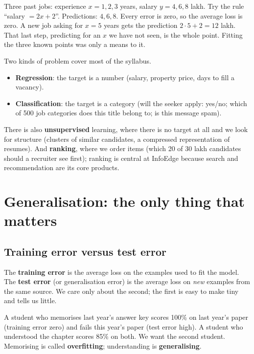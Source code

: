\begin{example}
Three past jobs: experience $x = 1, 2, 3$ years, salary $y = 4, 6, 8$ lakh. Try the rule ``salary $= 2x + 2$''.
Predictions: $4, 6, 8$. Every error is zero, so the average loss is zero. A new job asking for $x=5$ years gets
the prediction $2\cdot5+2 = 12$ lakh. That last step, predicting for an $x$ we have not seen, is the whole
point. Fitting the three known points was only a means to it.
\end{example}

Two kinds of problem cover most of the syllabus.
\begin{itemize}
\item \textbf{Regression}: the target is a number (salary, property price, days to fill a vacancy).
\item \textbf{Classification}: the target is a category (will the seeker apply: yes/no; which of 500 job
  categories does this title belong to; is this message spam).
\end{itemize}
There is also \textbf{unsupervised} learning, where there is no target at all and we look for structure
(clusters of similar candidates, a compressed representation of resumes). And \textbf{ranking}, where we
order items (which 20 of 30 lakh candidates should a recruiter see first); ranking is central at InfoEdge
because search and recommendation are its core products.

\section{Generalisation: the only thing that matters}

\subsection{Training error versus test error}
The \textbf{training error} is the average loss on the examples used to fit the model. The
\textbf{test error} (or generalisation error) is the average loss on \emph{new} examples from the same
source. We care only about the second; the first is easy to make tiny and tells us little.

\begin{intuition}
A student who memorises last year's answer key scores 100\% on last year's paper (training error zero) and
fails this year's paper (test error high). A student who understood the chapter scores 85\% on both.
We want the second student. Memorising is called \textbf{overfitting}; understanding is
\textbf{generalising}.
\end{intuition}

